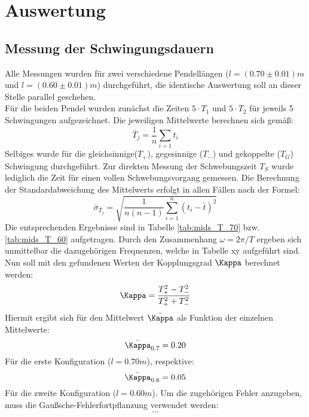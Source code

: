\section{Auswertung}

\subsection{Messung der Schwingungsdauern}
Alle Messungen wurden für zwei verschiedene Pendellängen ($l = (0.70 \pm 0.01)m$ und $l = (0.60 \pm 0.01)m$) durchgeführt, die identische Auswertung soll an dieser Stelle
parallel geschehen. \\
Für die beiden Pendel wurden zunächst die Zeiten $5 \cdot T_1$ und $5 \cdot T_2$ für jeweils 5 Schwingungen aufgezeichnet. Die jeweiligen Mittelwerte
berechnen sich gemäß:
\begin{equation}
\bar{T}_{j}=\frac{1}{n}\sum_{i=1}t_i
\end{equation}
Selbiges wurde für die gleichsinnige($T_{+}$), gegesinnige ($T_{-}$) und gekoppelte ($T_{G}$) Schwingung durchgeführt. Zur direkten Messung der Schwebungszeit $T_{S}$ wurde lediglich
die Zeit für einen vollen Schwebungsvorgang gemessen. Die Berechnung der Standardabweichung des Mittelwerts erfolgt in allen Fällen nach der Formel:
\begin{equation}
\bar{\sigma}_{\bar{T_j}}=\sqrt{\frac{1}{n(n-1)}\sum_{i=1}^{n}(t_i-\bar{t})^2}
\end{equation}
Die entsprechenden Ergebnisse sind in Tabelle \ref{tab:mids_T_70} bzw. \ref{tab:mids_T_60}  aufgetragen. Durch den Zusammenhang $\omega = 2\pi / T$ ergeben
sich unmittelbar die dazugehörigen Frequenzen, welche in Tabelle xy aufgeführt sind.\\
Nun soll mit den gefundenen Werten der Kopplungsgrad $\Kappa$ berechnet werden:
\begin{equation}
  \Kappa = \frac{T_{+}^2 - T_{-}^2}{T_{+}^2 + T_{-}^2}
\end{equation}
Hiermit ergibt sich für den Mittelwert $\bar{\Kappa}$ als Funktion der einzelnen Mittelwerte:
\begin{equation}
\bar{\Kappa}_{0.7} = 0.20
\end{equation}
Für die erste Konfiguration ($l = 0.70m$), respektive:
\begin{equation}
\bar{\Kappa}_{0.6} = 0.05
\end{equation}
Für die zweite Konfiguration ($l = 0.60m$). Um die zugehörigen Fehler anzugeben, muss die Gaußsche-Fehlerfortpflanzung verwendet werden:
\begin{equation}
  \dots
\end{equation}

